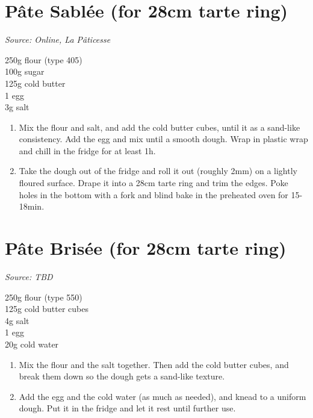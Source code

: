 \documentclass{report}
\begin{document}
\section[Pâte Sablée]{Pâte Sablée (for 28cm tarte ring)}
\textit{Source: Online, La Pâticesse}\\
\begin{minipage}[t]{0.21\textwidth} \vspace{0pt} 
250g flour (type 405)\\
100g sugar\\
125g cold butter\\
1 egg\\
3g salt
\end{minipage}
\hfill
\begin{minipage}[t]{0.78\textwidth} \vspace{0pt}
	\begin{enumerate}
		\item Mix the flour and salt, and add the cold butter cubes, until it as a sand-like consistency. Add the egg and mix until a smooth dough. Wrap in plastic wrap and chill in the fridge for at least 1h.
		\item Take the dough out of the fridge and roll it out (roughly 2mm) on a lightly floured surface. Drape it into a 28cm tarte ring and trim the edges. Poke holes in the bottom with a fork and blind bake in the preheated oven for 15-18min.
	\end{enumerate}	
\end{minipage}

\section[Pâte Brisée]{Pâte Brisée (for 28cm tarte ring)}
\textit{Source: TBD}\\
\begin{minipage}[t]{0.21\textwidth} \vspace{0pt} 
250g flour (type 550)\\
125g cold butter cubes\\
4g salt\\
1 egg\\
20g cold water
\end{minipage}
\hfill
\begin{minipage}[t]{0.78\textwidth} \vspace{0pt}
	\begin{enumerate}
		\item Mix the flour and the salt together. Then add the cold butter cubes, and break them down so the dough gets a sand-like texture.
		\item Add the egg and the cold water (as much as needed), and knead to a uniform dough. Put it in the fridge and let it rest until further use.
	\end{enumerate}	
\end{minipage}
\end{document}
